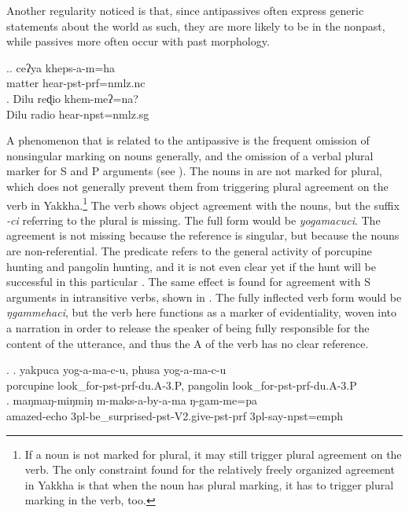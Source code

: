 Another regularity noticed is that, since antipassives often express generic statements about the world as such, they are more likely to be in the nonpast, while passives more often occur with past morphology.

\ex.\ag. ceʔya kheps-a-m=ha\\
matter hear{\sc [3sg]-pst-prf=nmlz.nc}\\
 
\bg. Dilu  reɖio khem-meʔ=na?\\
Dilu radio  hear{\sc [3sg]-npst=nmlz.sg}\\


A  phenomenon that is related to the antipassive  is the frequent omission of nonsingular marking on nouns generally, and the omission of a verbal plural marker for S and P arguments (see ). The nouns in \Next[a] are not marked for plural, which does  not generally prevent them from triggering plural agreement on the verb in Yakkha.\footnote{If a noun is not marked for plural, it may still trigger plural agreement on the verb. The only constraint found for the relatively freely organized agreement in Yakkha is that when the noun has plural marking, it has to trigger plural marking in the verb, too.} The verb shows object agreement with the nouns, but the suffix \emph{-ci} referring to the plural  is missing. The full form would be  \emph{yogamacuci}. The agreement is not missing because the reference is singular, but because the nouns are non-referential. The predicate refers to the general activity of porcupine hunting and pangolin hunting, and it is not even clear yet if the hunt will be successful in this particular . The same effect is found for agreement with S arguments in intransitive verbs, shown in \Next[b]. The fully inflected verb form would be \emph{ŋgammehaci}, but the verb here functions as a marker of evidentiality, woven into a narration in order to release the speaker of being fully responsible for the content of the utterance, and thus the A of the verb has no clear reference.


\ex. \ag. yakpuca   yog-a-ma-c-u, phusa    yog-a-ma-c-u\\
porcupine   look\_for{\sc -pst-prf-du.A-3.P}, pangolin   look\_for{\sc -pst-prf-du.A-3.P}\\
 
\bg. maŋmaŋ-miŋmiŋ m-maks-a-by-a-ma ŋ-gam-me=pa\\
	amazed{\sc -echo} {\sc 3pl-}be\_surprised{\sc -pst-V2.give-pst-prf} {\sc 3pl-}say{\sc -npst=emph}\\
	 
	


